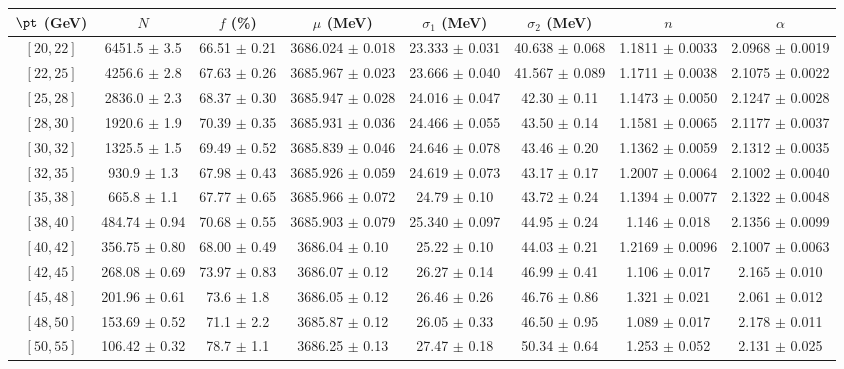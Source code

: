 \begin{tabular}{c||c|c|c|c|c|c|c}
$\pt$ (GeV) & $N$ & $f$ (\%) & $\mu$ (MeV) & $\sigma_1$ (MeV) & $\sigma_2$ (MeV) & $n$ & $\alpha$ \\
\hline
$[20, 22]$ & 6451.5 $\pm$ 3.5 & 66.51 $\pm$ 0.21 & 3686.024 $\pm$ 0.018 & 23.333 $\pm$ 0.031 & 40.638 $\pm$ 0.068 & 1.1811 $\pm$ 0.0033 & 2.0968 $\pm$ 0.0019\\
$[22, 25]$ & 4256.6 $\pm$ 2.8 & 67.63 $\pm$ 0.26 & 3685.967 $\pm$ 0.023 & 23.666 $\pm$ 0.040 & 41.567 $\pm$ 0.089 & 1.1711 $\pm$ 0.0038 & 2.1075 $\pm$ 0.0022\\
$[25, 28]$ & 2836.0 $\pm$ 2.3 & 68.37 $\pm$ 0.30 & 3685.947 $\pm$ 0.028 & 24.016 $\pm$ 0.047 & 42.30 $\pm$ 0.11 & 1.1473 $\pm$ 0.0050 & 2.1247 $\pm$ 0.0028\\
$[28, 30]$ & 1920.6 $\pm$ 1.9 & 70.39 $\pm$ 0.35 & 3685.931 $\pm$ 0.036 & 24.466 $\pm$ 0.055 & 43.50 $\pm$ 0.14 & 1.1581 $\pm$ 0.0065 & 2.1177 $\pm$ 0.0037\\
$[30, 32]$ & 1325.5 $\pm$ 1.5 & 69.49 $\pm$ 0.52 & 3685.839 $\pm$ 0.046 & 24.646 $\pm$ 0.078 & 43.46 $\pm$ 0.20 & 1.1362 $\pm$ 0.0059 & 2.1312 $\pm$ 0.0035\\
$[32, 35]$ & 930.9 $\pm$ 1.3 & 67.98 $\pm$ 0.43 & 3685.926 $\pm$ 0.059 & 24.619 $\pm$ 0.073 & 43.17 $\pm$ 0.17 & 1.2007 $\pm$ 0.0064 & 2.1002 $\pm$ 0.0040\\
$[35, 38]$ & 665.8 $\pm$ 1.1 & 67.77 $\pm$ 0.65 & 3685.966 $\pm$ 0.072 & 24.79 $\pm$ 0.10 & 43.72 $\pm$ 0.24 & 1.1394 $\pm$ 0.0077 & 2.1322 $\pm$ 0.0048\\
$[38, 40]$ & 484.74 $\pm$ 0.94 & 70.68 $\pm$ 0.55 & 3685.903 $\pm$ 0.079 & 25.340 $\pm$ 0.097 & 44.95 $\pm$ 0.24 & 1.146 $\pm$ 0.018 & 2.1356 $\pm$ 0.0099\\
$[40, 42]$ & 356.75 $\pm$ 0.80 & 68.00 $\pm$ 0.49 & 3686.04 $\pm$ 0.10 & 25.22 $\pm$ 0.10 & 44.03 $\pm$ 0.21 & 1.2169 $\pm$ 0.0096 & 2.1007 $\pm$ 0.0063\\
$[42, 45]$ & 268.08 $\pm$ 0.69 & 73.97 $\pm$ 0.83 & 3686.07 $\pm$ 0.12 & 26.27 $\pm$ 0.14 & 46.99 $\pm$ 0.41 & 1.106 $\pm$ 0.017 & 2.165 $\pm$ 0.010\\
$[45, 48]$ & 201.96 $\pm$ 0.61 & 73.6 $\pm$ 1.8 & 3686.05 $\pm$ 0.12 & 26.46 $\pm$ 0.26 & 46.76 $\pm$ 0.86 & 1.321 $\pm$ 0.021 & 2.061 $\pm$ 0.012\\
$[48, 50]$ & 153.69 $\pm$ 0.52 & 71.1 $\pm$ 2.2 & 3685.87 $\pm$ 0.12 & 26.05 $\pm$ 0.33 & 46.50 $\pm$ 0.95 & 1.089 $\pm$ 0.017 & 2.178 $\pm$ 0.011\\
$[50, 55]$ & 106.42 $\pm$ 0.32 & 78.7 $\pm$ 1.1 & 3686.25 $\pm$ 0.13 & 27.47 $\pm$ 0.18 & 50.34 $\pm$ 0.64 & 1.253 $\pm$ 0.052 & 2.131 $\pm$ 0.025\\

\end{tabular}
